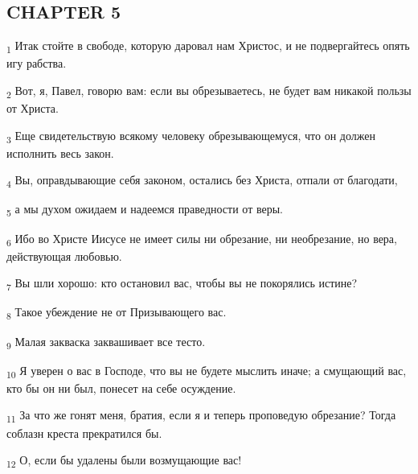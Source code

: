 \subsection{CHAPTER 5}
\begin{tcolorbox}
\textsubscript{1} Итак стойте в свободе, которую даровал нам Христос, и не подвергайтесь опять игу рабства.
\end{tcolorbox}
\begin{tcolorbox}
\textsubscript{2} Вот, я, Павел, говорю вам: если вы обрезываетесь, не будет вам никакой пользы от Христа.
\end{tcolorbox}
\begin{tcolorbox}
\textsubscript{3} Еще свидетельствую всякому человеку обрезывающемуся, что он должен исполнить весь закон.
\end{tcolorbox}
\begin{tcolorbox}
\textsubscript{4} Вы, оправдывающие себя законом, остались без Христа, отпали от благодати,
\end{tcolorbox}
\begin{tcolorbox}
\textsubscript{5} а мы духом ожидаем и надеемся праведности от веры.
\end{tcolorbox}
\begin{tcolorbox}
\textsubscript{6} Ибо во Христе Иисусе не имеет силы ни обрезание, ни необрезание, но вера, действующая любовью.
\end{tcolorbox}
\begin{tcolorbox}
\textsubscript{7} Вы шли хорошо: кто остановил вас, чтобы вы не покорялись истине?
\end{tcolorbox}
\begin{tcolorbox}
\textsubscript{8} Такое убеждение не от Призывающего вас.
\end{tcolorbox}
\begin{tcolorbox}
\textsubscript{9} Малая закваска заквашивает все тесто.
\end{tcolorbox}
\begin{tcolorbox}
\textsubscript{10} Я уверен о вас в Господе, что вы не будете мыслить иначе; а смущающий вас, кто бы он ни был, понесет на себе осуждение.
\end{tcolorbox}
\begin{tcolorbox}
\textsubscript{11} За что же гонят меня, братия, если я и теперь проповедую обрезание? Тогда соблазн креста прекратился бы.
\end{tcolorbox}
\begin{tcolorbox}
\textsubscript{12} О, если бы удалены были возмущающие вас!
\end{tcolorbox}
